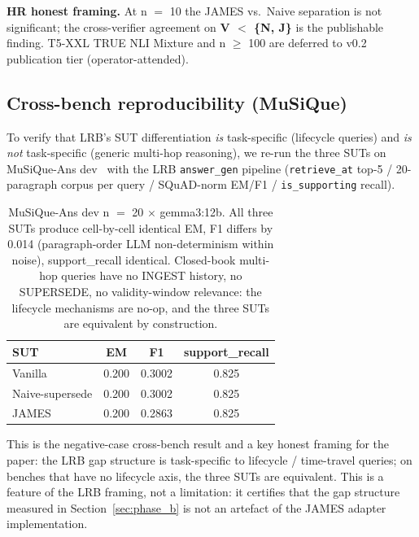 \documentclass[11pt,a4paper]{article}
\begin{document}
\textbf{HR honest framing.} At n $=$ 10 the JAMES vs.~Naive separation is not significant; the cross-verifier agreement on \textbf{V $<$ \{N, J\}} is the publishable finding. T5-XXL TRUE NLI Mixture and n $\geq$ 100 are deferred to v0.2 publication tier (operator-attended).

\subsection{Cross-bench reproducibility (MuSiQue)}
\label{sec:cross_bench}

To verify that LRB's SUT differentiation \emph{is} task-specific (lifecycle queries) and \emph{is not} task-specific (generic multi-hop reasoning), we re-run the three SUTs on MuSiQue-Ans dev~\cite{trivedi2022musique} with the LRB \texttt{answer\_gen} pipeline (\texttt{retrieve\_at} top-5 / 20-paragraph corpus per query / SQuAD-norm EM/F1 / \texttt{is\_supporting} recall).

\begin{table}[h]
\centering
\caption{MuSiQue-Ans dev n $=$ 20 $\times$ gemma3:12b. All three SUTs produce cell-by-cell identical EM, F1 differs by 0.014 (paragraph-order LLM non-determinism within noise), support\_recall identical. Closed-book multi-hop queries have no INGEST history, no SUPERSEDE, no validity-window relevance: the lifecycle mechanisms are no-op, and the three SUTs are equivalent by construction.}
\label{tab:musique_cross}
\begin{tabular}{l c c c}
\toprule
\textbf{SUT} & \textbf{EM} & \textbf{F1} & \textbf{support\_recall} \\
\midrule
Vanilla & 0.200 & 0.3002 & 0.825 \\
Naive-supersede & 0.200 & 0.3002 & 0.825 \\
JAMES & 0.200 & 0.2863 & 0.825 \\
\bottomrule
\end{tabular}
\end{table}

This is the negative-case cross-bench result and a key honest framing for the paper: the LRB gap structure is task-specific to lifecycle / time-travel queries; on benches that have no lifecycle axis, the three SUTs are equivalent. This is a feature of the LRB framing, not a limitation: it certifies that the gap structure measured in Section~\ref{sec:phase_b} is not an artefact of the JAMES adapter implementation.
\end{document}
